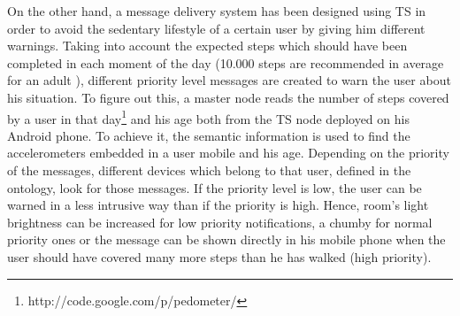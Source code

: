 On the other hand, a message delivery system has been designed using TS in order to avoid the sedentary lifestyle of a certain user by giving him different warnings.
Taking into account the expected steps which should have been completed in each moment of the day (10.000 steps are recommended in average for an adult \cite{tudor2002taking}), different priority level messages are created to warn the user about his situation.
To figure out this, a master node reads the number of steps covered by a user in that day\footnote{http://code.google.com/p/pedometer/} and his age both from the TS node deployed on his Android phone.
To achieve it, the semantic information is used to find the accelerometers embedded in a user mobile and his age. Depending on the priority of the messages, different devices which belong to that user, defined in the ontology, look for those messages.
If the priority level is low, the user can be warned in a less intrusive way than if the priority is high. Hence, room's light brightness can be increased for low priority notifications, a chumby for normal priority ones or the message can be shown directly in his mobile phone when the user should have covered many more steps than he has walked (high priority).